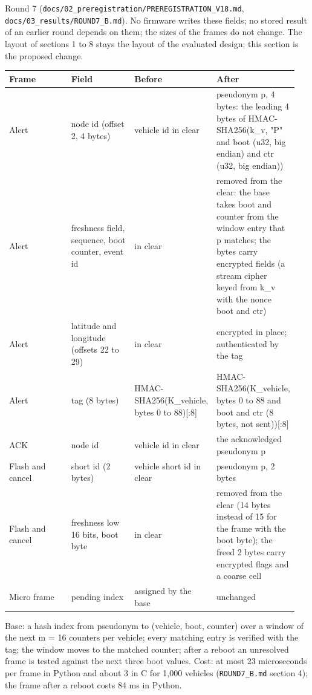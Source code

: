 Round 7 (\texttt{docs/02\_preregistration/PREREGISTRATION\_V18.md}, \texttt{docs/03\_results/ROUND7\_B.md}). No firmware writes these fields; no stored result of an earlier round depends on them; the sizes of the frames do not change. The layout of sections 1 to 8 stays the layout of the evaluated design; this section is the proposed change.

{\scriptsize\raggedright
\begin{longtable}{p{0.237\linewidth}p{0.237\linewidth}p{0.237\linewidth}p{0.237\linewidth}}
\toprule
Frame & Field & Before & After \\
\midrule
\endhead
Alert & node id (offset 2, 4 bytes) & vehicle id in clear & pseudonym p, 4 bytes: the leading 4 bytes of HMAC-SHA256(k\_v, "P" and boot (u32, big endian) and ctr (u32, big endian)) \\
Alert & freshness field, sequence, boot counter, event id & in clear & removed from the clear: the base takes boot and counter from the window entry that p matches; the bytes carry encrypted fields (a stream cipher keyed from k\_v with the nonce boot and ctr) \\
Alert & latitude and longitude (offsets 22 to 29) & in clear & encrypted in place; authenticated by the tag \\
Alert & tag (8 bytes) & HMAC-SHA256(K\_vehicle, bytes 0 to 88)[:8] & HMAC-SHA256(K\_vehicle, bytes 0 to 88 and boot and ctr (8 bytes, not sent))[:8] \\
ACK & node id & vehicle id in clear & the acknowledged pseudonym p \\
Flash and cancel & short id (2 bytes) & vehicle short id in clear & pseudonym p, 2 bytes \\
Flash and cancel & freshness low 16 bits, boot byte & in clear & removed from the clear (14 bytes instead of 15 for the frame with the boot byte); the freed 2 bytes carry encrypted flags and a coarse cell \\
Micro frame & pending index & assigned by the base & unchanged \\
\bottomrule
\end{longtable}}

Base: a hash index from pseudonym to (vehicle, boot, counter) over a window of the next m = 16 counters per vehicle; every matching entry is verified with the tag; the window moves to the matched counter; after a reboot an unresolved frame is tested against the next three boot values. Cost: at most 23 microseconds per frame in Python and about 3 in C for 1,000 vehicles (\texttt{ROUND7\_B.md} section 4); the frame after a reboot costs 84 ms in Python.


